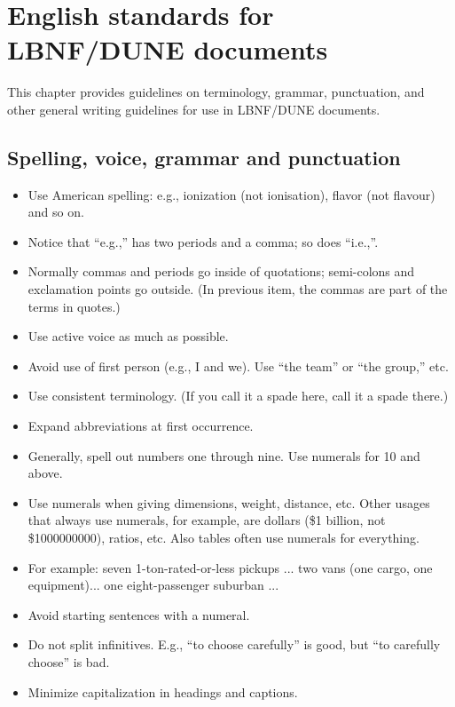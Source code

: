 \chapter{English standards for LBNF/DUNE documents}
\label{ch:english}

This chapter provides guidelines on terminology, grammar, punctuation, and other general writing guidelines for use in LBNF/DUNE documents. 


\section{Spelling, voice, grammar and punctuation}
\label{sec:english-spelling}

\begin{itemize}
\item Use American spelling: e.g., ionization (not ionisation), flavor (not flavour) and so on.
\item Notice that ``e.g.,'' has two periods and a comma; so does ``i.e.,''.
\item Normally commas and periods go inside of quotations;  semi-colons and exclamation points go outside.  (In previous item, the commas are part of the terms in quotes.)
\item Use active voice as much as possible. 
\item Avoid use of first person (e.g., I and we). Use ``the team'' or ``the group,'' etc.
\item Use consistent terminology. (If you call it a spade here, call it a spade there.)
\item Expand abbreviations at first occurrence.
\item Generally, spell out numbers one through nine. Use numerals for \num{10} and above.
\item Use numerals when giving dimensions, weight, distance, etc. Other usages that always use numerals, for example, are dollars (\$1 billion, not \$\num{1000000000}), ratios, etc. Also tables often use numerals for everything.
\item For example: seven 1-ton-rated-or-less pickups ... two vans (one cargo, one equipment)... one eight-passenger suburban ...
\item Avoid starting sentences with a numeral.
\item Do not split infinitives. E.g., ``to choose carefully'' is good, but ``to carefully choose'' is bad.
\item Minimize capitalization in headings and captions.

\end{itemize}
